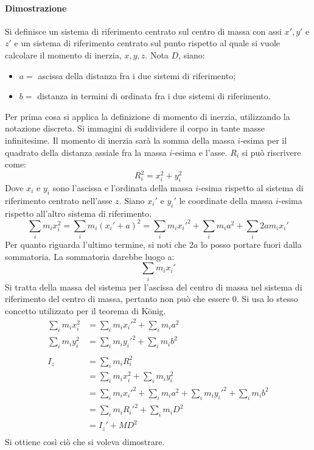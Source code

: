 \documentclass[10pt,a4paper]{book}
\begin{document}
\paragraph{Dimostrazione} Si definisce un sistema di riferimento centrato sul centro di massa con assi $x', y'$ e $z'$ e un sistema di riferimento centrato sul punto rispetto al quale si vuole calcolare il momento di inerzia, $x, y, z$.
Nota $D$, siano:
\begin{itemize}
	\item $a=$ ascissa della distanza fra i due sistemi di riferimento;
	\item $b=$ distanza in termini di ordinata fra i due sistemi di riferimento.
\end{itemize}
Per prima cosa si applica la definizione di momento di inerzia, utilizzando la notazione discreta. Si immagini di suddividere il corpo in tante masse infinitesime. Il momento di inerzia sarà la somma della massa $i$-esima per il quadrato della distanza assiale fra la massa $i$-esima e l'asse. $R_i$ si può riscrivere come:
\[
	R_i^2 = x_i^2 + y_i^2
\]
Dove $x_i$ e $y_i$ sono l'ascissa e l'ordinata della massa $i$-esima rispetto al sistema di riferimento centrato nell'asse $z$. Siano $x_i'$ e $y_i'$ le coordinate della massa $i$-esima rispetto all'altro sistema di riferimento.
\[
	\sum_i m_i x_i^2  = \sum_i m_i (x_i'+a)^2 = \sum_i m_i x_i'^2 + \sum_i m_i a^2 + \sum_i 2 a m_i x_i'
\]
Per quanto riguarda l'ultimo termine, si noti che $2a$ lo posso portare fuori dalla sommatoria. La sommatoria darebbe luogo a:
\[
	\sum_i m_i x_i'
\]
Si tratta della massa del sistema per l'ascissa del centro di massa nel sistema di riferimento del centro di massa, pertanto non può che essere $0$. Si usa lo stesso concetto utilizzato per il teorema di K\"onig.
\begin{equation*}
	\begin{aligned}
		\sum_i m_i x_i^2 &= \sum_i m_i x_i'^2 + \sum_i m_i a^2 \\
		\sum_i m_i y_i^2 &= \sum_i m_i y_i'^2 + \sum_i m_i b^2 \\
		\\
		I_z &= \sum_i m_i R_i^2 \\
		&= \sum_i m_i x_i^2 + \sum_i m_i y_i^2 \\
		&=\sum_i m_i x_i'^2 + \sum_i m_i a^2 + \sum_i m_i y_i'^2 + \sum_i m_i b^2 \\
		&= \sum_i m_i R_i'^2 +\sum_i m_i D^2 \\
		&= I_z' + MD^2 \\
	\end{aligned}
\end{equation*}
Si ottiene così ciò che si voleva dimostrare.
\end{document}
